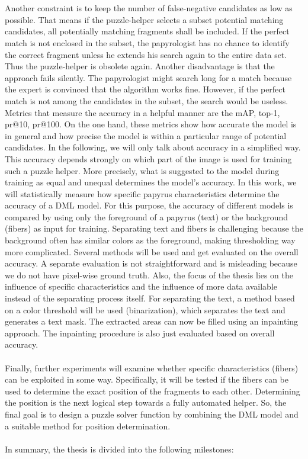 \documentclass[12pt,a4paper]{article}
\begin{document}
\\\\
Another constraint is to keep the number of false-negative candidates as low as possible. That means if the puzzle-helper selects a subset potential matching candidates, all potentially matching fragments shall be included. 
If the perfect match is not enclosed in the subset, the papyrologist has no chance to identify the correct fragment unless he extends his search again to the entire data set. Thus the puzzle-helper is obsolete again. Another disadvantage is that the approach fails silently. The papyrologist might search long for a match because the expert is convinced that the algorithm works fine. However, if the perfect match is not among the candidates in the subset, the search would be useless. Metrics that measure the accuracy in a helpful manner are the mAP, top-1, pr@10, pr@100.
On the one hand, these metrics show how accurate the model is in general and how precise the model is within a particular range of potential candidates. In the following, we will only talk about accuracy in a simplified way. This accuracy depends strongly on which part of the image is used for training such a puzzle helper. More precisely, what is suggested to the model during training as equal and unequal determines the model's accuracy. In this work, we will statistically measure how specific papyrus characteristics determine the accuracy of a DML model. For this purpose, the accuracy of different models is compared by using only the foreground of a papyrus (text) or the background (fibers) as input for training. 
Separating text and fibers is challenging because the background often has similar colors as the foreground, making thresholding way more complicated. Several methods will be used and get evaluated on the overall accuracy. A separate evaluation is not straightforward and is misleading because we do not have pixel-wise ground truth. Also, the focus of the thesis lies on the influence of specific characteristics and the influence of more data available instead of the separating process itself. For separating the text,  a method based on a color threshold will be used (binarization), which separates the text and generates a text mask. 
The extracted areas can now be filled using an inpainting approach. The inpainting procedure is also just evaluated based on overall accuracy. 
\\\\
Finally, further experiments will examine whether specific characteristics (fibers) can be exploited in some way. Specifically, it will be tested if the fibers can be used to determine the exact position of the fragments to each other. Determining the position is the next logical step towards a fully automated helper. So, the final goal is to design a puzzle solver function by combining the DML model and a suitable method for position determination. 
\\\\
In summary, the thesis is divided into the following milestones:
\end{document}
